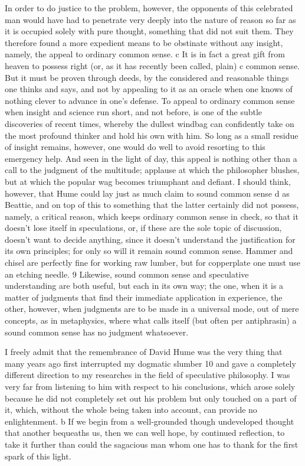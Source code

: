 In order to do justice to the problem, however, the opponents of this
celebrated man would have had to penetrate very deeply into the nature
of reason so far as it is occupied solely with pure thought, something
that did not suit them. They therefore found a more expedient means to
be obstinate without any insight, namely, the appeal to ordinary common
sense. c It is in fact a great gift from heaven to possess right (or, as it
has recently been called, plain) c common sense. But it must be proven
through deeds, by the considered and reasonable things one thinks and
says, and not by appealing to it as an oracle when one knows of nothing
clever to advance in one’s defense. To appeal to ordinary common sense
when insight and science run short, and not before, is one of the subtle
discoveries of recent times, whereby the dullest windbag can conﬁdently
take on the most profound thinker and hold his own with him. So long
as a small residue of insight remains, however, one would do well to
avoid resorting to this emergency help. And seen in the light of day,
this appeal is nothing other than a call to the judgment of the multitude;
applause at which the philosopher blushes, but at which the popular wag
becomes triumphant and deﬁant. I should think, however, that Hume
could lay just as much claim to sound common sense d as Beattie, and on
top of this to something that the latter certainly did not possess, namely,
a critical reason, which keeps ordinary common sense in check, so that
it doesn’t lose itself in speculations, or, if these are the sole topic of
discussion, doesn’t want to decide anything, since it doesn’t understand
the justiﬁcation for its own principles; for only so will it remain sound
common sense. Hammer and chisel are perfectly ﬁne for working raw
lumber, but for copperplate one must use an etching needle. 9 Likewise,
sound common sense and speculative understanding are both useful,
but each in its own way; the one, when it is a matter of judgments that
ﬁnd their immediate application in experience, the other, however, when
judgments are to be made in a universal mode, out of mere concepts, as
in metaphysics, where what calls itself (but often per antiphrasin) a sound
common sense has no judgment whatsoever.

I freely admit that the remembrance of David Hume was the very
thing that many years ago ﬁrst interrupted my dogmatic slumber 10 and
gave a completely different direction to my researches in the ﬁeld of
speculative philosophy. I was very far from listening to him with respect
to his conclusions, which arose solely because he did not completely set
out his problem but only touched on a part of it, which, without the
whole being taken into account, can provide no enlightenment. b If we
begin from a well-grounded though undeveloped thought that another
bequeaths us, then we can well hope, by continued reﬂection, to take it
further than could the sagacious man whom one has to thank for the ﬁrst
spark of this light.

